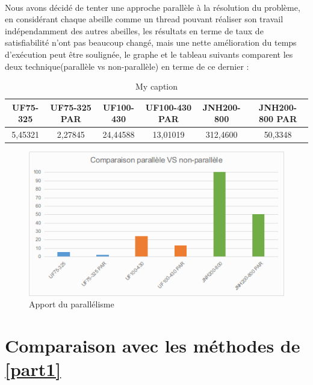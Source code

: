 	\paragraph{}
	Nous avons décidé de tenter une approche parallèle à la résolution du problème, en considérant chaque abeille comme un thread pouvant réaliser son travail indépendamment des autres abeilles, les résultats en terme de taux de satisfiabilité n'ont pas beaucoup changé, mais une nette amélioration du temps d'exécution peut être soulignée, le graphe et le tableau suivants comparent les deux technique(parallèle vs non-parallèle) en terme de ce dernier : 
	\begin{table}[H]
		\centering
		\caption{My caption}
		\label{my-label}
		\begin{tabular}{|c|c|c|c|c|c|}
			\hline
			\textbf{UF75-325} & \textbf{UF75-325 PAR} & \textbf{UF100-430} & \textbf{UF100-430 PAR} & \textbf{JNH200-800} & \textbf{JNH200-800 PAR} \\ \hline
			5,45321           & 2,27845               & 24,44588           & 13,01019               & 312,4600            & 50,3348                 \\ \hline
		\end{tabular}
	\end{table}
	\begin{figure}[H]
		\centering
		\includegraphics[width=\textwidth]{images/parVSnonPar.png}
		\caption{Apport du parallélisme}
	\end{figure}
	\section{Comparaison avec les méthodes de \ref{part1}}
